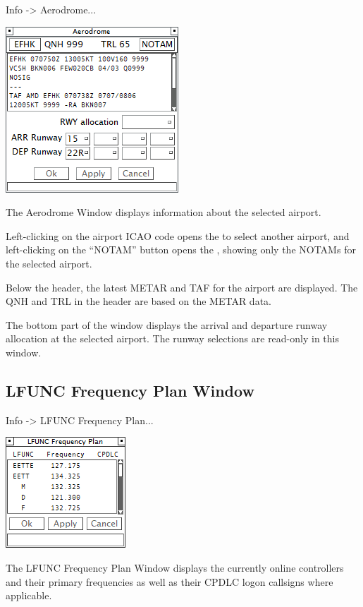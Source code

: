 \documentclass[11pt,a4paper]{memoir}
\begin{document}
\textit{} Info -> Aerodrome...

\includegraphics{img/adinfo.png}

The Aerodrome Window displays information about the selected airport.

Left-clicking on the airport ICAO code opens the \textit{} to select another airport, and left-clicking on the “NOTAM” button opens the \textit{}, showing only the NOTAMs for the selected airport.

Below the header, the latest METAR and TAF for the airport are displayed. The QNH and TRL in the header are based on the METAR data.

The bottom part of the window displays the arrival and departure runway allocation at the selected airport. The runway selections are read-only in this window.

\subsection{LFUNC Frequency Plan Window}
\label{win:lfunc}

\textit{} Info -> LFUNC Frequency Plan...

\includegraphics{img/lfunc.png}

The LFUNC Frequency Plan Window displays the currently online controllers and their primary frequencies as well as their CPDLC logon callsigns where applicable.
\end{document}
